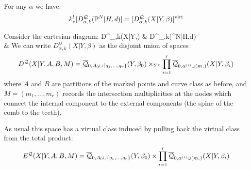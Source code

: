 \begin{lem} \label{Comb loci pull back} For any $\alpha$ we have:
\begin{equation*} k_{\text{v}}^! [D^\mathcal{Q}_{\alpha,k}(\mathbb P^N|H,d)] = [D^\mathcal{Q}_{\alpha,k}(X|Y,\beta)]^{\operatorname{virt}} \end{equation*} \end{lem}

Consider the cartesian diagram:
\bcd
D^_{\alpha,k}(X|Y,\beta) \ar[r,"k"] \ar[d]  & D^_{\alpha,k}(\PP^N|H,d) \ar[d] \\
 \ar[r,"k"] & 
\ecd
We can write $D^\mathcal{Q}_{\alpha,k}(X|Y,\beta)$ as the disjoint union of spaces
\begin{equation*} D^{\mathcal{Q}}(X|Y,A,B,M) = \overline{\mathcal Q}_{0,A_0 \cup \{q_1, \ldots, q_r\}}(Y,\beta_0) \times_{Y^r} \prod_{i=1}^r \overline{\mathcal Q}_{0,\alpha^{(i)}\cup (m_i)}(X|Y,\beta_i) \end{equation*}
where $A$ and $B$ are partitions of the marked points and curve class as before, and $M=(m_1,\ldots,m_r)$ records the intersection multiplicities at the nodes which connect the internal component to the external components (the spine of the comb to the teeth).

As usual this space has a virtual class induced by pulling back the virtual class from the total product:
\begin{equation*} E^{\mathcal{Q}}(X|Y,A,B,M) = \overline{\mathcal Q}_{0,A_0 \cup \{q_1, \ldots, q_r\}}(Y,\beta_0) \times \prod_{i=1}^r \overline{\mathcal Q}_{0,\alpha^{(i)}\cup (m_i)}(X|Y,\beta_i) \end{equation*}

